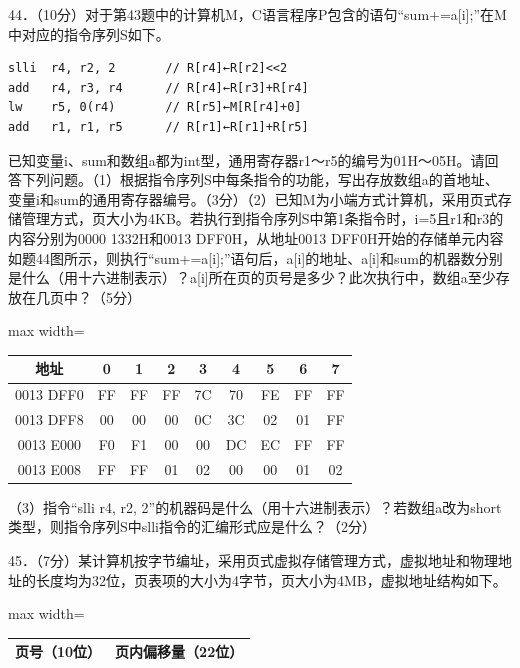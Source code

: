 \documentclass[UTF8,11pt]{ctexart}
\begin{document}
44．（10分）对于第43题中的计算机M，C语言程序P包含的语句“sum+=a[i];”在M中对应的指令序列S如下。


\begin{Verbatim}[breaklines,breakanywhere,fontsize=\small]
slli  r4, r2, 2       // R[r4]←R[r2]<<2
add   r4, r3, r4      // R[r4]←R[r3]+R[r4]
lw    r5, 0(r4)       // R[r5]←M[R[r4]+0]
add   r1, r1, r5      // R[r1]←R[r1]+R[r5]
\end{Verbatim}

已知变量i、sum和数组a都为int型，通用寄存器r1～r5的编号为01H～05H。请回答下列问题。（1）根据指令序列S中每条指令的功能，写出存放数组a的首地址、变量i和sum的通用寄存器编号。（3分）（2）已知M为小端方式计算机，采用页式存储管理方式，页大小为4KB。若执行到指令序列S中第1条指令时，i=5且r1和r3的内容分别为0000 1332H和0013 DFF0H，从地址0013 DFF0H开始的存储单元内容如题44图所示，则执行“sum+=a[i];”语句后，a[i]的地址、a[i]和sum的机器数分别是什么（用十六进制表示）？a[i]所在页的页号是多少？此次执行中，数组a至少存放在几页中？（5分）


\begin{center}\begin{adjustbox}{max width=\linewidth}\begin{tabular}{|c|c|c|c|c|c|c|c|c|}\hline
地址 & 0 & 1 & 2 & 3 & 4 & 5 & 6 & 7\\\hline
0013 DFF0 & FF & FF & FF & 7C & 70 & FE & FF & FF\\\hline
0013 DFF8 & 00 & 00 & 00 & 0C & 3C & 02 & 01 & FF\\\hline
0013 E000 & F0 & F1 & 00 & 00 & DC & EC & FF & FF\\\hline
0013 E008 & FF & FF & 01 & 02 & 00 & 00 & 01 & 02\\\hline\end{tabular}\end{adjustbox}\end{center}

（3）指令“slli r4, r2, 2”的机器码是什么（用十六进制表示）？若数组a改为short类型，则指令序列S中slli指令的汇编形式应是什么？（2分）


45．（7分）某计算机按字节编址，采用页式虚拟存储管理方式，虚拟地址和物理地址的长度均为32位，页表项的大小为4字节，页大小为4MB，虚拟地址结构如下。


\begin{center}\begin{adjustbox}{max width=\linewidth}\begin{tabular}{|>{\raggedright\arraybackslash}p{\dimexpr(\linewidth-4\tabcolsep-3\arrayrulewidth)/2\relax}|>{\raggedright\arraybackslash}p{\dimexpr(\linewidth-4\tabcolsep-3\arrayrulewidth)/2\relax}|}\hline
页号（10位） & 页内偏移量（22位）\\\hline\end{tabular}\end{adjustbox}\end{center}
\end{document}
